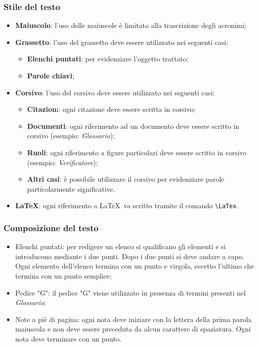 \subsubsection{Stile del testo}
\begin{itemize}
	\item \textbf{Maiuscolo}: l'uso delle maiuscole è limitato alla trascrizione degli acronimi;
	\item \textbf{Grassetto}: l'uso del grassetto deve essere utilizzato nei seguenti casi: 
	\begin{itemize}
		\item \textbf{Elenchi puntati}: per evidenziare l'oggetto trattato;
		\item \textbf{Parole chiavi};
	\end{itemize}
	\item \textbf{Corsivo}: l'uso del corsivo deve essere utilizzato nei seguenti casi:
	\begin{itemize}
		\item \textbf{Citazion}i: ogni citazione deve essere scritta in corsivo; 
		\item \textbf{Documenti}: ogni riferimento ad un documento deve essere scritto in corsivo (esempio: \textit{Glossario});
		\item \textbf{Ruoli}: ogni riferimento a figure particolari deve essere scritto in corsivo (esempio: \textit{Verificatore});
		\item \textbf{Altri casi}: è possibile utilizzare il corsivo per evidenziare parole particolarmente significative.
	\end{itemize}
	\item \textbf{\LaTeX}: ogni riferimento a \LaTeX\ va scritto tramite il comando \verb|\LaTex|.
\end{itemize}

\subsubsection{Composizione del testo}
\begin{itemize}
	\item Elenchi puntati: per redigere un elenco si qualificano gli elementi e si introducono mediante
	i due punti. Dopo i due punti si deve andare a capo. Ogni elemento dell'elenco termina con un punto e virgola, eccetto l'ultimo che termina con un punto semplice;
	\item Pedice "G": il pedice "G" viene utilizzato in presenza di termini presenti nel \textit{Glossario};
	\item Note a piè di pagina: ogni nota deve iniziare con la lettera della prima parola maiuscola e non deve essere preceduta da alcun carattere di spaziatura. Ogni nota deve terminare con un punto.
\end{itemize}

